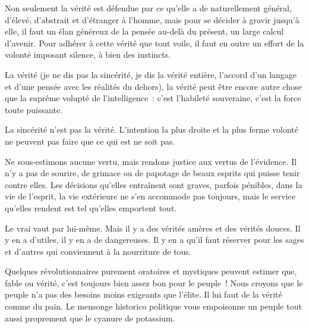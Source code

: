 \documentclass[french,twoside]{book} %
\newcommand{\astermono}{\medskip\centerline{\color{rubric}\large\selectfont{\syms ✻}}\medskip\par}%
\begin{document}
\astermono

\noindent Non seulement la vérité est défendue par ce qu’elle a de naturellement général, d’élevé, d’abstrait et d’étranger à l’homme, mais pour se décider à gravir jusqu’à elle, il faut un élan généreux de la pensée au-delà du présent, un large calcul d’avenir. Pour adhérer à cette vérité que tout voile, il faut en outre un effort de la volonté imposant silence, à bien des instincts.\par

\astermono

\noindent La vérité (je ne dis pas la sincérité, je dis la vérité entière, l’accord d’un langage et d’une pensée avec les réalités du dehors), la vérité peut être encore autre chose que la suprême volupté de l’intelligence : c’est l’habileté souveraine, c’est la force toute puissante.\par

\astermono

\noindent La sincérité n’est pas la vérité. L’intention la plus droite et la plus ferme volonté ne peuvent pas faire que ce qui est ne soit pas.\par

\astermono

\noindent Ne sous-estimons aucune vertu, mais rendons justice aux vertus de l’évidence. Il n’y a pas de sourire, de grimace ou de papotage de beaux esprits qui puisse tenir contre elles. Les décisions qu’elles entraînent sont graves, parfois pénibles, dans la vie de l’esprit, la vie extérieure ne s’en accommode pas toujours, mais le service qu’elles rendent est tel qu’elles emportent tout.\par

\astermono

\noindent Le vrai vaut par lui-même. Mais il y a des vérités amères et des vérités douces. Il y en a d’utiles, il y en a de dangereuses. Il y en a qu’il faut réserver pour les sages et d’autres qui conviennent à la nourriture de tous.\par

\astermono

\noindent Quelques révolutionnaires purement oratoires et mystiques peuvent estimer que, fable ou vérité, c’est toujours bien assez bon pour le peuple ! Nous croyons que le peuple n’a pas des besoins moins exigeants que l’élite. Il lui faut de la vérité comme du pain. Le mensonge historico politique vous empoisonne un peuple tout aussi proprement que le cyanure de potassium.\par
\end{document}

